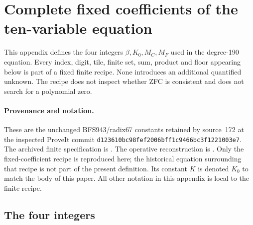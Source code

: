 \section{Complete fixed coefficients of the ten-variable equation}
\label{app:compact-coefficients}

This appendix defines the four integers $\beta,K_0,M_C,M_F$ used in the
degree-190 equation.  Every index, digit, tile, finite set, sum, product and
floor appearing below is part of a fixed finite recipe.  None introduces
an additional quantified unknown.  The recipe does not inspect whether
ZFC is consistent and does not search for a polynomial zero.

\paragraph{Provenance and notation.}
These are the unchanged BFS943/radix67 constants retained by source~172
at the inspected ProveIt commit
\texttt{d123610bc98fef2006bff1c9466bc3f1221003e7}.
The archived finite specification is
.
The operative reconstruction is
.
Only the fixed-coefficient recipe is reproduced here; the historical
equation surrounding that recipe is not part of the present definition.
Its constant $K$ is denoted $K_0$ to match the body of this paper.
All other notation in this appendix is local to the finite recipe.

\subsection{The four integers}

